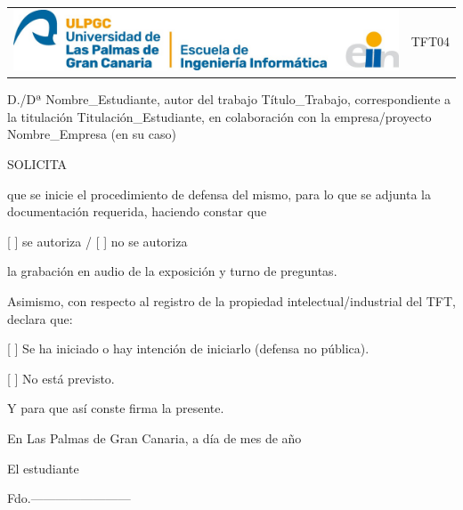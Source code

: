 
\pagestyle{empty}

\begin{tabular}{p{15cm}p{5cm}}
  \includegraphics{Ilustraciones/LogoEII.jpg}   &  TFT04\\
\end{tabular}

\vspace{1em}
\fboxrule=2pt
\begin{center}
\end{center}

\vspace{1em}
\justify
D./Dª Nombre\_Estudiante, autor del trabajo Título\_Trabajo, correspondiente a la titulación Titulación\_Estudiante, en colaboración con la empresa/proyecto Nombre\_Empresa (en su caso)

\vspace{1em}
SOLICITA

\vspace{1em}
que se inicie el procedimiento de defensa del mismo, para lo que se adjunta la documentación requerida, haciendo constar que 

[ ] se autoriza / [ ] no se autoriza 

la grabación en audio de la exposición y turno de preguntas.

\vspace{1em}
Asimismo, con respecto al registro de la propiedad intelectual/industrial del TFT, declara que:

[ ] Se ha iniciado o hay intención de iniciarlo (defensa no pública).

[ ] No está previsto.

\vspace{1em}
Y para que así conste firma la presente. 

\begin{center}
En Las Palmas de Gran Canaria, a día de mes de año

\vspace{1em}
El estudiante

\vspace{3em}
Fdo.------------------------
\end{center}

